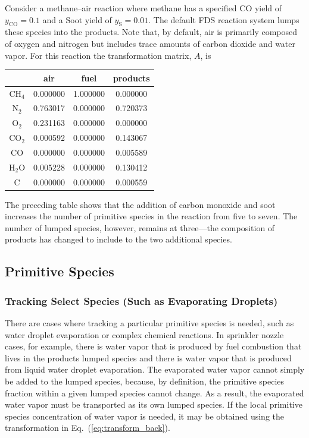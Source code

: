 Consider a methane--air reaction where methane has a specified CO yield of $y_{\mathrm{CO}}=0.1$ and a Soot yield of $y_{\mathrm{S}}=0.01$. The default FDS reaction system lumps these species into the products. Note that, by default, air is primarily composed of oxygen and nitrogen but includes trace amounts of carbon dioxide and water vapor. For this reaction the transformation matrix, $A$, is
\begin{center}
\begin{tabular}{|c|c|c|c|}
\hline  & air & fuel & products \\ \hline \hline
{CH$_4$}           & 0.000000 & 1.000000 & 0.000000 \\
{N$_2$}            & 0.763017 & 0.000000 & 0.720373 \\
{O$_2$}            & 0.231163 & 0.000000 & 0.000000 \\
{CO$_2$}           & 0.000592 & 0.000000 & 0.143067 \\
{CO}               & 0.000000 & 0.000000 & 0.005589 \\ 
{H$_2$O}           & 0.005228 & 0.000000 & 0.130412 \\
{C}                & 0.000000 & 0.000000 & 0.000559 \\ \hline
\end{tabular}
\end{center}
The preceding table shows that the addition of carbon monoxide and soot increases the number of primitive species in the reaction from five to seven. The number of lumped species, however, remains at three---the composition of products has changed to include to the two additional species.


\subsection{Primitive Species}

\subsubsection{Tracking Select Species (Such as Evaporating Droplets)}

There are cases where tracking a particular primitive species is needed, such as water droplet evaporation or complex chemical reactions. In sprinkler nozzle cases, for example, there is water vapor that is produced by fuel combustion that lives in the products lumped species and there is water vapor that is produced from liquid water droplet evaporation. The evaporated water vapor cannot simply be added to the lumped species, because, by definition, the primitive species fraction within a given lumped species cannot change. As a result, the evaporated water vapor must be transported as its own lumped species.  If the local primitive species concentration of water vapor is needed, it may be obtained using the transformation in Eq.~(\ref{eq:transform_back}).   

